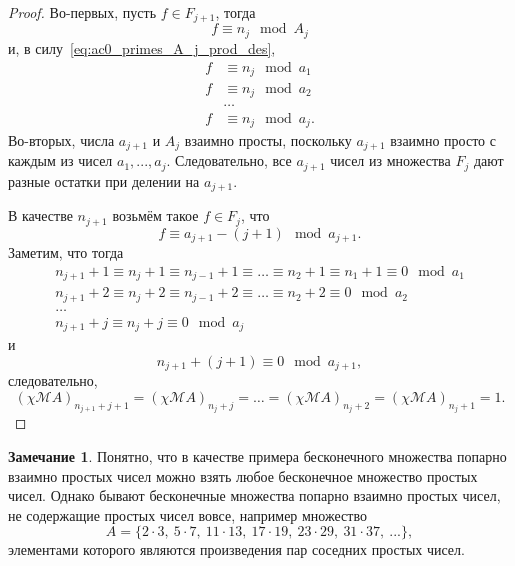\documentclass[a4paper,openbib]{article}
\theoremstyle{definition}
\newtheorem{remark}[lemma]{Замечание}
\begin{document}
\begin{proof}
	Во-первых, пусть $f \in F_{j+1}$,
	тогда
	\begin{equation}
		f \equiv n_j \mod A_j
	\end{equation}
	и, в силу~\eqref{eq:ac0_primes_A_j_prod_des},
	\begin{equation}
		\begin{array}{rl}
		f &\equiv n_j \mod a_1
		\\
		f &\equiv n_j \mod a_2
		\\
		&\dots
		\\
		f &\equiv n_j \mod a_j
		.
		\end{array}
	\end{equation}
	Во-вторых, числа $a_{j+1}$ и $A_j$ взаимно просты, поскольку $a_{j+1}$ взаимно просто с каждым из чисел $a_1,...,a_j$.
	Следовательно, все $a_{j+1}$ чисел из множества $F_j$ дают разные остатки при делении на $a_{j+1}$.

	В качестве $n_{j+1}$ возьмём такое $f\in F_j$, что
	\begin{equation}
		f \equiv a_{j+1} - (j+1) \mod a_{j+1}
		.
	\end{equation}
	Заметим, что тогда
	\begin{equation}
		\begin{array}{l}
			n_{j+1} + 1 \equiv n_j + 1 \equiv n_{j-1} + 1 \equiv \dots \equiv n_2 + 1 \equiv n_1 + 1 \equiv 0 \mod a_1
			\\
			n_{j+1} + 2 \equiv n_j + 2 \equiv n_{j-1} + 2 \equiv \dots \equiv n_2 + 2 \equiv 0 \mod a_2
			\\
			\dots
			\\
			n_{j+1} + j \equiv n_j + j  \equiv 0 \mod a_j
		\end{array}
	\end{equation}
	и
	\begin{equation}
		n_{j+1} + (j+1) \equiv 0 \mod a_{j+1}
		,
	\end{equation}
	следовательно,
	\begin{equation}
		(\chi\mathscr{M}A)_{n_{j+1} + j+1} = (\chi\mathscr{M}A)_{n_{j} + j} =
		\dots = (\chi\mathscr{M}A)_{n_{j} + 2} = (\chi\mathscr{M}A)_{n_{j} + 1} = 1
		.
	\end{equation}


\end{proof}

\begin{remark}
	Понятно, что в качестве примера бесконечного множества
	попарно взаимно простых чисел можно взять любое бесконечное множество простых чисел.
	Однако бывают бесконечные множества попарно взаимно простых чисел,
	не содержащие простых чисел вовсе, например множество
	\begin{equation}
		A = \{ 2\cdot 3,~5 \cdot 7,~11 \cdot 13,~17\cdot 19,~23\cdot29,~31\cdot 37,~...\},
	\end{equation}
	элементами которого являются произведения пар соседних простых чисел.
\end{remark}
\end{document}
